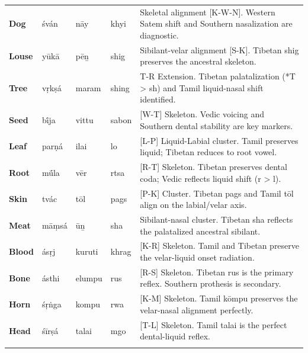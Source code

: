 \begin{longtable}{p{} p{} p{} p{} p{}}
\textbf{Dog} & śván & nāy & khyi & \small Skeletal alignment [K-W-N]. Western Satem shift and Southern nasalization are diagnostic. \\ 
\addlinespace[10pt]

\textbf{Louse} & yūkā & pēṉ & shig & \small Sibilant-velar alignment [S-K]. Tibetan shig preserves the ancestral skeleton. \\ 
\addlinespace[10pt]

\textbf{Tree} & vṛkṣá & maram & shing & \small *T-R Extension. Tibetan palatalization (*T > sh) and Tamil liquid-nasal shift identified. \\ 
\addlinespace[10pt]

\textbf{Seed} & bī́ja & vittu & sabon & \small [W-T] Skeleton. Vedic voicing and Southern dental stability are key markers. \\ 
\addlinespace[10pt]

\textbf{Leaf} & parṇá & ilai & lo & \small [L-P] Liquid-Labial cluster. Tamil preserves liquid; Tibetan reduces to root vowel. \\ 
\addlinespace[10pt]

\textbf{Root} & mū́la & vēr & rtsa & \small [R-T] Skeleton. Tibetan preserves dental coda; Vedic reflects liquid shift (r > l). \\ 
\addlinespace[10pt]

\textbf{Skin} & tvác & tōl & pags & \small [P-K] Cluster. Tibetan pags and Tamil tōl align on the labial/velar axis. \\ 
\addlinespace[10pt]

\textbf{Meat} & māṃsá & ūṉ & sha & \small Sibilant-nasal cluster. Tibetan sha reflects the palatalized ancestral sibilant. \\ 
\addlinespace[10pt]

\textbf{Blood} & ásṛj & kuruti & khrag & \small [K-R] Skeleton. Tamil and Tibetan preserve the velar-liquid onset radiation. \\ 
\addlinespace[10pt]

\textbf{Bone} & ásthi & elumpu & rus & \small [R-S] Skeleton. Tibetan rus is the primary reflex. Southern prothesis is secondary. \\ 
\addlinespace[10pt]

\textbf{Horn} & śṛṅga & kompu & rwa & \small [K-M] Skeleton. Tamil kōmpu preserves the velar-nasal alignment perfectly. \\ 
\addlinespace[10pt]

\textbf{Head} & śīrṣá & talai & mgo & \small [T-L] Skeleton. Tamil talai is the perfect dental-liquid reflex. \\ 
\addlinespace[10pt]


\end{longtable}
